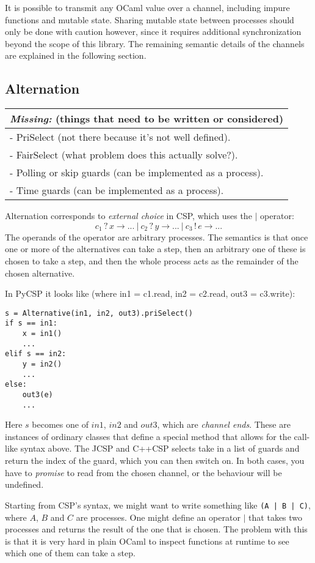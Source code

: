 \documentclass[a4paper,12pt]{article}
\newcommand{\missing}[1]{
  \begin{tabular}{|p{11cm}|}
    \hline
    \emph{Missing:} {\scriptsize (things that need to be written or considered)} \\
    \hline
    #1
    \hline
  \end{tabular}
}
\begin{document}
It is possible to transmit any OCaml value over a channel, including impure functions and mutable 
state. Sharing mutable state between processes should only be done with caution however, since it 
requires additional synchronization beyond the scope of this library. The remaining semantic 
details of the channels are explained in the following section.

\subsection{Alternation}
\missing{
- PriSelect (not there because it's not well defined).\\
- FairSelect (what problem does this actually solve?).\\
- Polling or skip guards (can be implemented as a process). \\
- Time guards (can be implemented as a process). \\
}

Alternation corresponds to \emph{external choice} in CSP, which uses the $|$ operator:
\[c_1\,?\,x \to ...\ |\ c_2\,?\,y \to ...\ |\ c_3\,!\,e \to ...\]
The operands of the operator are arbitrary processes. The semantics is that once one or 
more of the alternatives can take a step, then an arbitrary one of these is chosen to take a 
step, and then the whole process acts as the remainder of the chosen alternative.

In PyCSP it looks like (where in1 = c1.read, in2 = c2.read, out3 = c3.write):
\begin{verbatim}
s = Alternative(in1, in2, out3).priSelect()
if s == in1:
    x = in1()
    ...
elif s == in2:
    y = in2()
    ...
else:
    out3(e)
    ...
\end{verbatim}
Here $s$ becomes one of $in1$, $in2$ and $out3$, which are \emph{channel ends}. These are instances
of ordinary classes that define a special method that allows for the call-like syntax above.
The JCSP and C++CSP selects take in a list of guards and return the index of the guard, which you can 
then switch on. In both cases, you have to \emph{promise} to read from the chosen channel, or the 
behaviour will be undefined.

Starting from CSP's syntax, we might want to write something like \texttt{(A | B | C)}, where $A$, $B$
and $C$ are processes. One might define an operator $|$ that takes two processes and returns the result 
of the one that is chosen. The problem with this is that it is very hard in plain OCaml to inspect 
functions at runtime to see which one of them can take a step.
\end{document}
